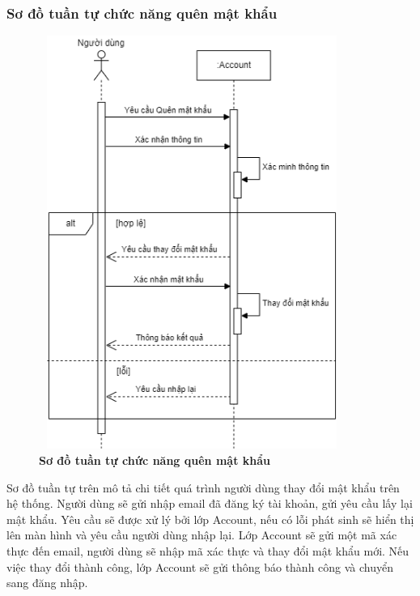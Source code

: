 \subsubsection{Sơ đồ tuần tự chức năng quên mật khẩu}
\begin{figure}[H]
  \centering
  \includegraphics[width=10cm,height=13.5cm]{Images/sequence/sequence_forgot_password.png}
  \caption[Sơ đồ tuần tự chức năng quên mật khẩu]{\bfseries \fontsize{12pt}{0pt}
  \selectfont Sơ đồ tuần tự chức năng quên mật khẩu}
  \label{sequence_forgot_pass} %
\end{figure}
Sơ đồ tuần tự trên mô tả chi tiết quá trình người dùng thay đổi mật khẩu trên hệ thống. Người dùng sẽ gửi nhập email đã đăng ký tài khoản, gửi yêu cầu
lấy lại mật khẩu. Yêu cầu sẽ được xử lý bởi lớp Account, nếu có lỗi phát sinh sẽ hiển thị lên màn hình và yêu cầu người dùng nhập lại. Lớp Account sẽ gửi một mã xác thực
đến email, người dùng sẽ nhập mã xác thực và thay đổi mật khẩu mới. Nếu việc thay đổi thành công, lớp Account sẽ gửi thông báo thành công và chuyển sang đăng nhập.

